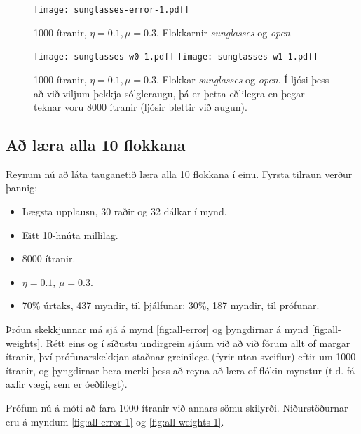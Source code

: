 \documentclass[a4paper,icelandic]{article}
\begin{document}
\begin{figure}[h!]
  \begin{center}
    \texttt{[image: sunglasses-error-1.pdf]}
  \end{center}
  \caption{1000 ítranir, $\eta=0.1, \mu=0.3$. Flokkarnir \emph{sunglasses} og
  \emph{open}}
  \label{fig:sunglasses-error-1}
\end{figure}
\begin{figure}[h!]
  \begin{center}
    \texttt{[image: sunglasses-w0-1.pdf]}
    \texttt{[image: sunglasses-w1-1.pdf]}
  \end{center}
  \caption{1000 ítranir, $\eta=0.1,\mu=0.3$. Flokkar \emph{sunglasses} og
  \emph{open}. Í ljósi þess að við viljum þekkja
  sólgleraugu, þá er þetta eðlilegra en þegar teknar voru 8000 ítranir
  (ljósir blettir við augun).}
  \label{fig:sunglasses-weights-1}
\end{figure}


\subsection{Að læra alla 10 flokkana}

Reynum nú að láta tauganetið læra alla 10 flokkana í einu. Fyrsta
tilraun verður þannig:
\begin{itemize}
  \item Lægsta upplausn, 30 raðir og 32 dálkar í mynd.
  \item Eitt 10-hnúta millilag.
  \item 8000 ítranir.
  \item $\eta = 0.1$, $\mu=0.3$.
  \item 70\% úrtaks, 437 myndir, til þjálfunar; 30\%, 187 myndir, til
    prófunar.
\end{itemize}
Þróun skekkjunnar má sjá á mynd \ref{fig:all-error} og þyngdirnar á mynd
\ref{fig:all-weights}. Rétt eins og í síðustu undirgrein sjáum við að
við fórum allt of margar ítranir, því prófunarskekkjan staðnar
greinilega (fyrir utan sveiflur) eftir um 1000 ítranir, og þyngdirnar
bera merki þess að reyna að læra of flókin mynstur (t.d. fá axlir vægi,
sem er óeðlilegt).

Prófum nú á móti að fara 1000 ítranir við annars sömu skilyrði.
Niðurstöðurnar eru á myndum \ref{fig:all-error-1} og
\ref{fig:all-weights-1}. 
\end{document}

